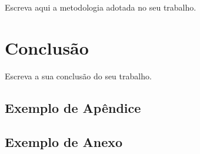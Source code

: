 \documentclass[
	12pt,				%
	openright,			%
	oneside,			%
	a4paper,			%
	english,			%
	brazil				%
	]{abntex2}
\theoremstyle{definition}
\begin{document}
Escreva aqui a metodologia adotada no seu trabalho.

\chapter{Conclusão}

Escreva a sua conclusão do seu trabalho.


\postextual{}

\nocite{angular2024, dotnet2024, sqlserver2024}

  

\begin{apendicesenv}
\partapendices{}
\chapter{Exemplo de Apêndice}
\end{apendicesenv}

\begin{anexosenv}
\partanexos{}
\chapter{Exemplo de Anexo}
\end{anexosenv}
\end{document}
